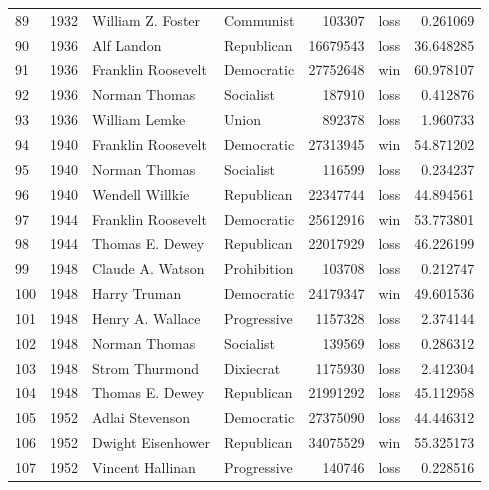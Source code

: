 \documentclass[
  letterpaper,
  DIV=11,
  numbers=noendperiod]{scrreprt}
\begin{document}
\begin{tabular}{lrllrlr}
89  &  1932 &       William Z. Foster &              Communist &        103307 &   loss &   0.261069 \\
90  &  1936 &              Alf Landon &             Republican &      16679543 &   loss &  36.648285 \\
91  &  1936 &      Franklin Roosevelt &             Democratic &      27752648 &    win &  60.978107 \\
92  &  1936 &           Norman Thomas &              Socialist &        187910 &   loss &   0.412876 \\
93  &  1936 &           William Lemke &                  Union &        892378 &   loss &   1.960733 \\
94  &  1940 &      Franklin Roosevelt &             Democratic &      27313945 &    win &  54.871202 \\
95  &  1940 &           Norman Thomas &              Socialist &        116599 &   loss &   0.234237 \\
96  &  1940 &         Wendell Willkie &             Republican &      22347744 &   loss &  44.894561 \\
97  &  1944 &      Franklin Roosevelt &             Democratic &      25612916 &    win &  53.773801 \\
98  &  1944 &         Thomas E. Dewey &             Republican &      22017929 &   loss &  46.226199 \\
99  &  1948 &        Claude A. Watson &            Prohibition &        103708 &   loss &   0.212747 \\
100 &  1948 &            Harry Truman &             Democratic &      24179347 &    win &  49.601536 \\
101 &  1948 &        Henry A. Wallace &            Progressive &       1157328 &   loss &   2.374144 \\
102 &  1948 &           Norman Thomas &              Socialist &        139569 &   loss &   0.286312 \\
103 &  1948 &          Strom Thurmond &              Dixiecrat &       1175930 &   loss &   2.412304 \\
104 &  1948 &         Thomas E. Dewey &             Republican &      21991292 &   loss &  45.112958 \\
105 &  1952 &         Adlai Stevenson &             Democratic &      27375090 &   loss &  44.446312 \\
106 &  1952 &       Dwight Eisenhower &             Republican &      34075529 &    win &  55.325173 \\
107 &  1952 &        Vincent Hallinan &            Progressive &        140746 &   loss &   0.228516 \\

\end{tabular}
\end{document}
